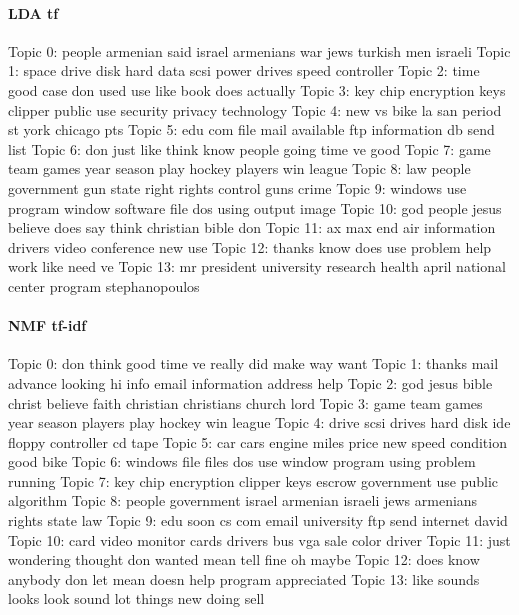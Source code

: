 \documentclass[12pt,a4paper]{report}
\begin{document}
\begin{multicols}{2}
\paragraph{LDA tf}
\begin{spverbatim}
Topic 0:
people armenian said israel armenians war jews turkish men israeli
Topic 1:
space drive disk hard data scsi power drives speed controller
Topic 2:
time good case don used use like book does actually
Topic 3:
key chip encryption keys clipper public use security privacy technology
Topic 4:
new vs bike la san period st york chicago pts
Topic 5:
edu com file mail available ftp information db send list
Topic 6:
don just like think know people going time ve good
Topic 7:
game team games year season play hockey players win league
Topic 8:
law people government gun state right rights control guns crime
Topic 9:
windows use program window software file dos using output image
Topic 10:
god people jesus believe does say think christian bible don
Topic 11:
ax max end air information drivers video conference new use
Topic 12:
thanks know does use problem help work like need ve
Topic 13:
mr president university research health april national center program stephanopoulos

\end{spverbatim}
\columnbreak
\paragraph{NMF tf-idf}
\begin{spverbatim}
Topic 0:
don think good time ve really did make way want
Topic 1:
thanks mail advance looking hi info email information address help
Topic 2:
god jesus bible christ believe faith christian christians church lord
Topic 3:
game team games year season players play hockey win league
Topic 4:
drive scsi drives hard disk ide floppy controller cd tape
Topic 5:
car cars engine miles price new speed condition good bike
Topic 6:
windows file files dos use window program using problem running
Topic 7:
key chip encryption clipper keys escrow government use public algorithm
Topic 8:
people government israel armenian israeli jews armenians rights state law
Topic 9:
edu soon cs com email university ftp send internet david
Topic 10:
card video monitor cards drivers bus vga sale color driver
Topic 11:
just wondering thought don wanted mean tell fine oh maybe
Topic 12:
does know anybody don let mean doesn help program appreciated
Topic 13:
like sounds looks look sound lot things new doing sell
\end{spverbatim}
\end{multicols}
\end{document}
